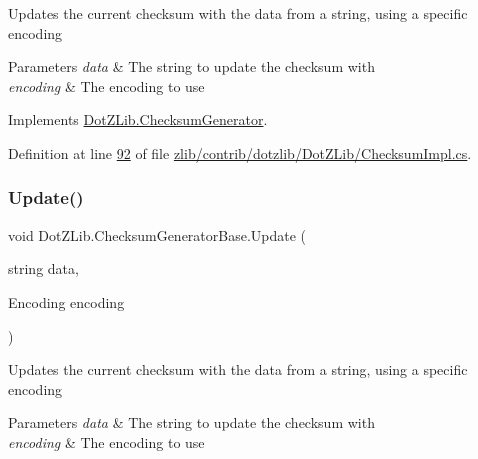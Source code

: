 Updates the current checksum with the data from a string, using a specific encoding 


\begin{DoxyParams}{Parameters}
{\em data} & The string to update the checksum with\\
\hline
{\em encoding} & The encoding to use\\
\hline
\end{DoxyParams}


Implements \hyperlink{interface_dot_z_lib_1_1_checksum_generator_ab894f35764ea30031c616517a6a00391}{Dot\+Z\+Lib.\+Checksum\+Generator}.



Definition at line \hyperlink{zlib_2contrib_2dotzlib_2_dot_z_lib_2_checksum_impl_8cs_source_l00092}{92} of file \hyperlink{zlib_2contrib_2dotzlib_2_dot_z_lib_2_checksum_impl_8cs_source}{zlib/contrib/dotzlib/\+Dot\+Z\+Lib/\+Checksum\+Impl.\+cs}.

\mbox{\label{class_dot_z_lib_1_1_checksum_generator_base_ad8e1adfbbfcc12ab74c772f3292bfee3}} 
\subsubsection{\texorpdfstring{Update()}{Update()}\hspace{0.1cm}{\footnotesize\ttfamily [8/8]}}
{\footnotesize\ttfamily void Dot\+Z\+Lib.\+Checksum\+Generator\+Base.\+Update (\begin{DoxyParamCaption}\item[{string}]{data,  }\item[{Encoding}]{encoding }\end{DoxyParamCaption})\hspace{0.3cm}{\ttfamily [inline]}}



Updates the current checksum with the data from a string, using a specific encoding 


\begin{DoxyParams}{Parameters}
{\em data} & The string to update the checksum with\\
\hline
{\em encoding} & The encoding to use\\
\hline
\end{DoxyParams}


